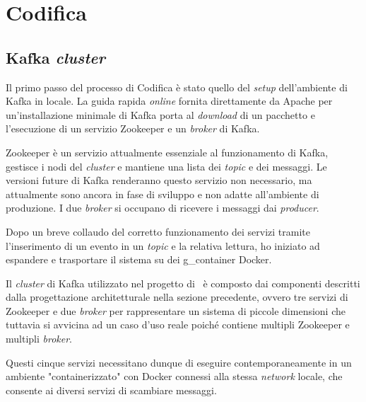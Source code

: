 




\section{Codifica}

\subsection{Kafka \textit{cluster}}

Il primo passo del processo di Codifica è stato quello del \textit{setup} dell'ambiente di Kafka in locale.
La guida rapida \textit{online} fornita direttamente da Apache per un'installazione minimale di Kafka porta al \textit{download} di un pacchetto e l'esecuzione di un servizio Zookeeper e un \textit{broker} di Kafka.

Zookeeper è un servizio attualmente essenziale al funzionamento di Kafka, gestisce i nodi del \textit{cluster} e mantiene una lista dei \textit{topic} e dei messaggi.
Le versioni future di Kafka renderanno questo servizio non necessario, ma attualmente sono ancora in fase di sviluppo e non adatte all'ambiente di produzione.
I due \textit{broker} si occupano di ricevere i messaggi dai \textit{producer}.

Dopo un breve collaudo del corretto funzionamento dei servizi tramite l'inserimento di un evento in un \textit{topic} e la relativa lettura, ho iniziato ad espandere e trasportare il sistema su dei \gls{g_container} Docker.

Il \textit{cluster} di Kafka utilizzato nel progetto di \stage\ è composto dai componenti descritti dalla progettazione architetturale nella sezione precedente, ovvero tre servizi di Zookeeper e due \textit{broker} per rappresentare un sistema di piccole dimensioni che tuttavia si avvicina ad un caso d'uso reale poiché contiene multipli Zookeeper e multipli \textit{broker}.

Questi cinque servizi necessitano dunque di eseguire contemporaneamente in un ambiente "containerizzato" con Docker connessi alla stessa \textit{network} locale, che consente ai diversi servizi di scambiare messaggi.

